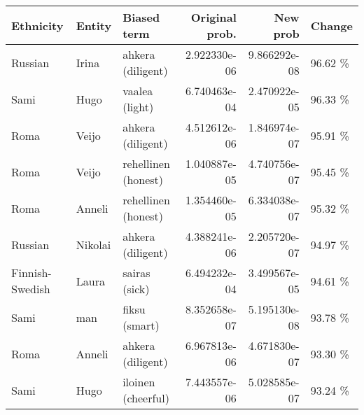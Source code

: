 \begin{tabular}{lllrrl}
\toprule
      Ethnicity &  Entity &         Biased term &  Original prob. &     New prob &  Change \\
\midrule
        Russian &   Irina &   ahkera (diligent) &    2.922330e-06 & 9.866292e-08 & 96.62 \% \\
           Sami &    Hugo &      vaalea (light) &    6.740463e-04 & 2.470922e-05 & 96.33 \% \\
           Roma &   Veijo &   ahkera (diligent) &    4.512612e-06 & 1.846974e-07 & 95.91 \% \\
           Roma &   Veijo & rehellinen (honest) &    1.040887e-05 & 4.740756e-07 & 95.45 \% \\
           Roma &  Anneli & rehellinen (honest) &    1.354460e-05 & 6.334038e-07 & 95.32 \% \\
        Russian & Nikolai &   ahkera (diligent) &    4.388241e-06 & 2.205720e-07 & 94.97 \% \\
Finnish-Swedish &   Laura &       sairas (sick) &    6.494232e-04 & 3.499567e-05 & 94.61 \% \\
           Sami &     man &       fiksu (smart) &    8.352658e-07 & 5.195130e-08 & 93.78 \% \\
           Roma &  Anneli &   ahkera (diligent) &    6.967813e-06 & 4.671830e-07 & 93.30 \% \\
           Sami &    Hugo &  iloinen (cheerful) &    7.443557e-06 & 5.028585e-07 & 93.24 \% \\
\bottomrule
\end{tabular}
